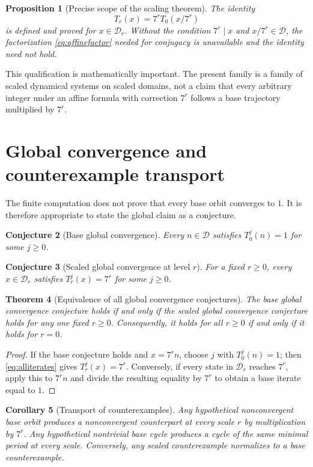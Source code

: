 \documentclass[11pt]{article}
\newtheorem{theorem}{Theorem}[section]
\newtheorem{proposition}[theorem]{Proposition}
\newtheorem{corollary}[theorem]{Corollary}
\newtheorem{conjecture}[theorem]{Conjecture}
\begin{document}
\begin{proposition}[Precise scope of the scaling theorem]
The identity
\[
T_r(x)=7^rT_0(x/7^r)
\]
is defined and proved for $x\in\mathcal D_r$. Without the condition $7^r\mid x$ and $x/7^r\in\mathcal D$, the factorization \eqref{eq:affinefactor} needed for conjugacy is unavailable and the identity need not hold.
\end{proposition}

This qualification is mathematically important. The present family is a family of scaled dynamical systems on scaled domains, not a claim that every arbitrary integer under an affine formula with correction $7^r$ follows a base trajectory multiplied by $7^r$.

\section{Global convergence and counterexample transport}
The finite computation does not prove that every base orbit converges to $1$. It is therefore appropriate to state the global claim as a conjecture.

\begin{conjecture}[Base global convergence]
Every $n\in\mathcal D$ satisfies $T_0^j(n)=1$ for some $j\ge0$.
\end{conjecture}

\begin{conjecture}[Scaled global convergence at level $r$]
For a fixed $r\ge0$, every $x\in\mathcal D_r$ satisfies $T_r^j(x)=7^r$ for some $j\ge0$.
\end{conjecture}

\begin{theorem}[Equivalence of all global convergence conjectures]
The base global convergence conjecture holds if and only if the scaled global convergence conjecture holds for any one fixed $r\ge0$. Consequently, it holds for all $r\ge0$ if and only if it holds for $r=0$.
\end{theorem}
\begin{proof}
If the base conjecture holds and $x=7^rn$, choose $j$ with $T_0^j(n)=1$; then \eqref{eq:alliterates} gives $T_r^j(x)=7^r$. Conversely, if every state in $\mathcal D_r$ reaches $7^r$, apply this to $7^rn$ and divide the resulting equality by $7^r$ to obtain a base iterate equal to $1$.
\end{proof}

\begin{corollary}[Transport of counterexamples]
Any hypothetical nonconvergent base orbit produces a nonconvergent counterpart at every scale $r$ by multiplication by $7^r$. Any hypothetical nontrivial base cycle produces a cycle of the same minimal period at every scale. Conversely, any scaled counterexample normalizes to a base counterexample.
\end{corollary}
\end{document}
